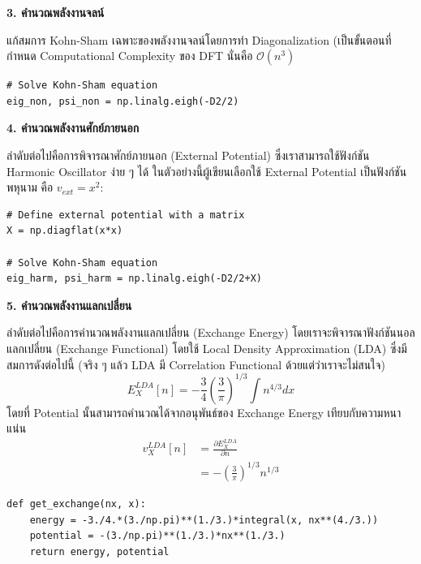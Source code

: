 \vspace{5pt}

\noindent \textbf{3. คำนวณพลังงานจลน์}

แก้สมการ Kohn-Sham เฉพาะของพลังงานจลน์โดยการทำ Diagonalization (เป็นขั้นตอนที่กำหนด Computational Complexity ของ DFT นั่นคือ $\mathcal{O}(n^{3})$

\begin{lstlisting}[style=MyPython]
# Solve Kohn-Sham equation
eig_non, psi_non = np.linalg.eigh(-D2/2)
\end{lstlisting}

\vspace{5pt}

\noindent \textbf{4. คำนวณพลังงานศักย์ภายนอก}

ลำดับต่อไปคือการพิจารณาศักย์ภายนอก (External Potential) ซึ่งเราสามารถใช้ฟังก์ชัน Harmonic Oscillator ง่าย ๆ ได้ ในตัวอย่างนี้ผู้เขียนเลือกใช้ External Potential เป็นฟังก์ชันพหุนาม คือ $v_{ext}=x^2$:

\begin{lstlisting}[style=MyPython]
# Define external potential with a matrix
X = np.diagflat(x*x)

# Solve Kohn-Sham equation
eig_harm, psi_harm = np.linalg.eigh(-D2/2+X)
\end{lstlisting}

\vspace{5pt}

\noindent \textbf{5. คำนวณพลังงานแลกเปลี่ยน}

ลำดับต่อไปคือการคำนวณพลังงานแลกเปลี่ยน (Exchange Energy) โดยเราจะพิจารณาฟังก์ชันนอลแลกเปลี่ยน (Exchange Functional) โดยใช้ Local Density Approximation (LDA) ซึ่งมีสมการดังต่อไปนี้ (จริง ๆ แล้ว LDA มี Correlation Functional ด้วยแต่ว่าเราจะไม่สนใจ)
%
\begin{equation}
  E_X^{LDA}[n] = -\frac{3}{4} \left(\frac{3}{\pi}\right)^{1/3} \int n^{4/3} dx
\end{equation}
%
โดยที่ Potential นั้นสามารถคำนวณได้จากอนุพันธ์ของ Exchange Energy เทียบกับความหนาแน่น
%
\begin{align}
  v_X^{LDA}[n] & = \frac{\partial E_X^{LDA}}{\partial n} \nonumber \\
               & = - \left(\frac{3}{\pi}\right)^{1/3} n^{1/3}
\end{align}

\vspace{5pt}

\begin{lstlisting}[style=MyPython]
def get_exchange(nx, x):
    energy = -3./4.*(3./np.pi)**(1./3.)*integral(x, nx**(4./3.))
    potential = -(3./np.pi)**(1./3.)*nx**(1./3.)
    return energy, potential
\end{lstlisting}

